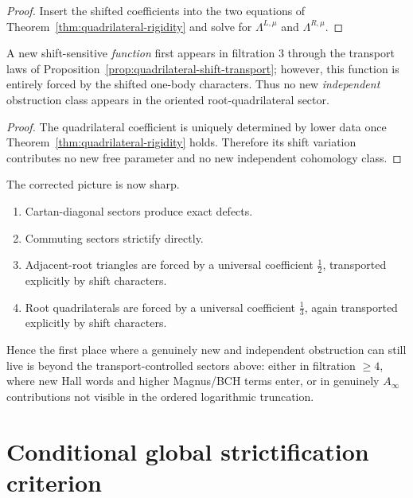 \begin{proof}
Insert the shifted coefficients into the two equations of
Theorem~\ref{thm:quadrilateral-rigidity} and solve for
$\Lambda^{L,\mu}$ and $\Lambda^{R,\mu}$.
\end{proof}

\begin{corollary}
\ClaimStatusProvedHere
\label{cor:no-new-filtration3-shift-obstruction}
A new shift-sensitive \emph{function} first appears in filtration $3$
through the transport laws of
Proposition~\ref{prop:quadrilateral-shift-transport}; however, this
function is entirely forced by the shifted one-body characters.  Thus no
new \emph{independent} obstruction class appears in the oriented
root-quadrilateral sector.
\end{corollary}

\begin{proof}
The quadrilateral coefficient is uniquely determined by lower data once
Theorem~\ref{thm:quadrilateral-rigidity} holds.  Therefore its shift
variation contributes no new free parameter and no new independent
cohomology class.
\end{proof}

\begin{remark}
The corrected picture is now sharp.
\begin{enumerate}
\item Cartan-diagonal sectors produce exact defects.
\item Commuting sectors strictify directly.
\item Adjacent-root triangles are forced by a universal coefficient
  $\frac12$, transported explicitly by shift characters.
\item Root quadrilaterals are forced by a universal coefficient
  $\frac13$, again transported explicitly by shift characters.
\end{enumerate}
Hence the first place where a genuinely new and independent obstruction
can still live is beyond the transport-controlled sectors above:
either in filtration $\ge 4$, where new Hall words and higher Magnus/BCH
terms enter, or in genuinely $A_\infty$ contributions not visible in the
ordered logarithmic truncation.
\end{remark}

\section{Conditional global strictification criterion}

